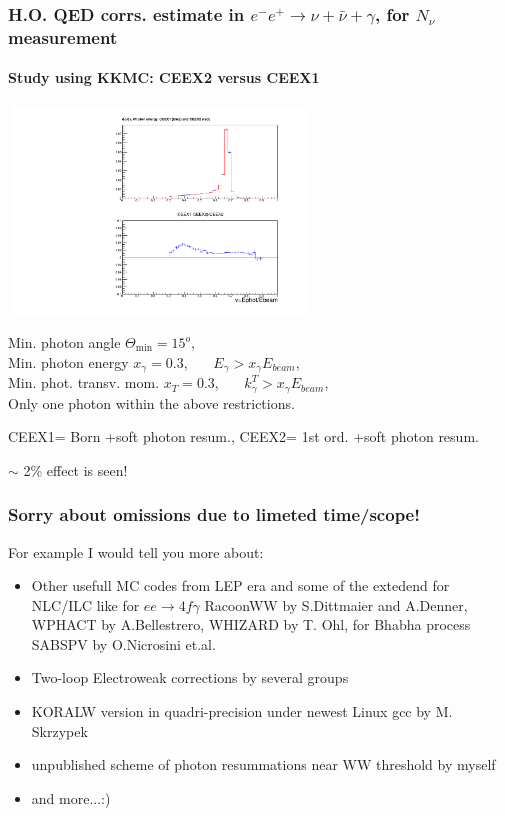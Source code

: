 \documentclass{beamer}
\newcommand{\crd}{\color{red}}
\begin{document}
\begin{frame}[fragile]
\frametitle{\small\bf H.O. QED corrs. estimate
 in $e^-e^+\to\nu+\bar\nu+\gamma$, for $N_\nu$ measurement}
\framesubtitle{Study using KKMC: CEEX2 versus CEEX1}

\vspace{-2mm}
{\includegraphics[width=80mm,height=55mm]{mcCeex21.pdf}}

\footnotesize
Min. photon angle $\Theta_{\min}=15^o$,\\
Min. photon energy $x_\gamma=0.3$, ~~~$E_\gamma > x_\gamma E_{beam}$,\\
Min. phot. transv. mom. $x_T=0.3$, ~~~$k^T_\gamma > x_\gamma E_{beam}$,\\
Only one photon within the above restrictions.

\footnotesize
CEEX1= Born +soft photon resum.,
CEEX2= 1st ord. +soft photon resum.

{\crd $\sim$ 2\% effect is seen!}

\end{frame}


\begin{frame}[fragile]
\frametitle{\bf Sorry about omissions due to limeted time/scope!}
For example I would tell you more about:
\begin{itemize}
\item
Other usefull MC codes from LEP era and some of the extedend
for NLC/ILC like for $ee\to 4f\gamma$ 
RacoonWW by S.Dittmaier and A.Denner, WPHACT by A.Bellestrero,
WHIZARD by T. Ohl, for Bhabha process
SABSPV by O.Nicrosini et.al.
\item
Two-loop Electroweak corrections by several groups
\item
KORALW version in quadri-precision under newest Linux gcc by M. Skrzypek
\item
unpublished scheme of photon resummations near WW threshold by myself
\item
and more...:)
\end{itemize}


\end{frame}
\end{document}

